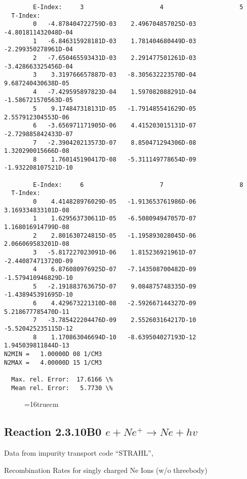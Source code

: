 \documentclass[12pt,dvipdfmx]{article}
\begin{document}
{\begin{small}
\begin{verbatim}
        E-Index:     3                     4                     5
  T-Index:
        0   -4.878404722759D-03    2.496704857025D-03   -4.801811432048D-04
        1   -6.846315928181D-03    1.781404680449D-03   -2.299350278961D-04
        2   -7.650465593431D-03    2.291477501261D-03   -3.428663325456D-04
        3    3.319766657887D-03   -8.305632223570D-04    9.687240430638D-05
        4   -7.429595897823D-04    1.597082088291D-04   -1.586721570563D-05
        5    9.174847318131D-05   -1.791485541629D-05    2.557912304553D-06
        6   -3.656971171905D-06    4.415203015131D-07   -2.729885842433D-07
        7   -2.390420213573D-07    8.850471294306D-08    1.320290015666D-08
        8    1.760145190417D-08   -5.311149778654D-09   -1.932208107521D-10

        E-Index:     6                     7                     8
  T-Index:
        0    4.414828976029D-05   -1.913653761986D-06    3.169334833101D-08
        1    1.629563730611D-05   -6.508094947057D-07    1.168016914799D-08
        2    2.801630724815D-05   -1.195893028045D-06    2.066069583201D-08
        3   -5.817227023091D-06    1.815236921961D-07   -2.440874713720D-09
        4    6.876080976925D-07   -7.143508700482D-09   -1.579410946829D-10
        5   -2.191883763675D-07    9.084875748335D-09   -1.438945391695D-10
        6    4.429673221310D-08   -2.592667144327D-09    5.218677785470D-11
        7   -3.785422204476D-09    2.552603164217D-10   -5.520425235115D-12
        8    1.170863046694D-10   -8.639504027193D-12    1.945039811844D-13
N2MIN =   1.00000D 08 1/CM3
N2MAX =   4.00000D 15 1/CM3

  Max. rel. Error:  17.6166 \%
  Mean rel. Error:   5.7730 \%

\end{verbatim}\end{small}
\begin{figure} \label{2.3.8A0}
\epsfxsize=16truecm 
\end{figure}
\newpage
\subsection{
Reaction 2.3.10B0   $e + Ne^+ \rightarrow  Ne + hv$ }

Data from impurity transport code ``STRAHL'', \cite{kn:Behringer}

  Recombination Rates for singly charged Ne Ions (w/o threebody)



}
\end{document}
